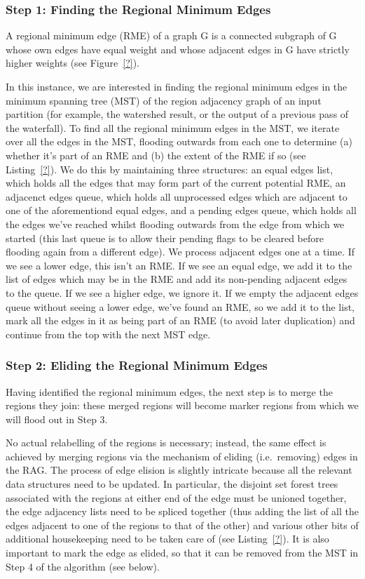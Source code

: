 \subsubsection{Step 1: Finding the Regional Minimum Edges}

A regional minimum edge (RME) of a graph G is a connected subgraph of G whose own edges have equal weight and whose adjacent edges in G have strictly higher weights (see Figure~\ref{?}).

In this instance, we are interested in finding the regional minimum edges in the minimum spanning tree (MST) of the region adjacency graph of an input partition (for example, the watershed result, or the output of a previous pass of the waterfall). To find all the regional minimum edges in the MST, we iterate over all the edges in the MST, flooding outwards from each one to determine (a) whether it's part of an RME and (b) the extent of the RME if so (see Listing~\ref{?}). We do this by maintaining three structures: an equal edges list, which holds all the edges that may form part of the current potential RME, an adjacenct edges queue, which holds all unprocessed edges which are adjacent to one of the aforementiond equal edges, and a pending edges queue, which holds all the edges we've reached whilst flooding outwards from the edge from which we started (this last queue is to allow their pending flags to be cleared before flooding again from a different edge). We process adjacent edges one at a time. If we see a lower edge, this isn't an RME. If we see an equal edge, we add it to the list of edges which may be in the RME and add its non-pending adjacent edges to the queue. If we see a higher edge, we ignore it. If we empty the adjacent edges queue without seeing a lower edge, we've found an RME, so we add it to the list, mark all the edges in it as being part of an RME (to avoid later duplication) and continue from the top with the next MST edge.

\subsubsection{Step 2: Eliding the Regional Minimum Edges}

Having identified the regional minimum edges, the next step is to merge the regions they join: these merged regions will become marker regions from which we will flood out in Step 3.

No actual relabelling of the regions is necessary; instead, the same effect is achieved by merging regions via the mechanism of eliding (i.e.~removing) edges in the RAG. The process of edge elision is slightly intricate because all the relevant data structures need to be updated. In particular, the disjoint set forest trees associated with the regions at either end of the edge must be unioned together, the edge adjacency lists need to be spliced together (thus adding the list of all the edges adjacent to one of the regions to that of the other) and various other bits of additional housekeeping need to be taken care of (see Listing~\ref{?}). It is also important to mark the edge as elided, so that it can be removed from the MST in Step 4 of the algorithm (see below).

